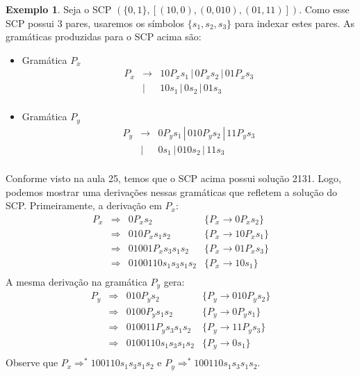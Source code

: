 \documentclass[a4paper]{article}
\theoremstyle{definition}
\newtheorem{Example}{Exemplo}
\begin{document}
  \begin{Example}
    Seja o SCP $(\{0,1\}, [(10,0), (0,010), (01,11)])$. Como esse SCP possui 3
    pares, usaremos os símbolos $\{s_1,s_2,s_3\}$ para indexar estes pares. As
    gramáticas produzidas para o SCP acima são:
    \begin{itemize}
      \item Gramática $P_x$
        \[
          \begin{array}{lcl}
            P_x & \to &  10 P_x s_1 \,|\, 0P_x s_2 \,|\, 01P_x s_3\\
                & \mid & 10s_1 \,|\, 0s_2\,|\, 01s_3\\
          \end{array}
        \]
      \item Gramática $P_y$
        \[
          \begin{array}{lcl}
            P_y & \to & 0P_y s_1 \,|\, 010P_ys_2 \,|\, 11 P_y s_3 \\
                & \mid & 0s_1 \,|\, 010s_2 \,|\, 11s_3\\
          \end{array}
        \]
      \end{itemize}

      Conforme visto na aula 25, temos que o SCP acima possui solução 2131.
      Logo, podemos mostrar uma derivações nessas gramáticas que refletem
      a solução do SCP. Primeiramente, a derivação em $P_x$:
      \[
        \begin{array}{lcll}
          P_x & \Rightarrow & 0P_xs_2       & \{P_x \to 0 P_x s_2\} \\
              & \Rightarrow & 010P_x s_1s_2 & \{P_x \to 10 P_x s_1\} \\
              & \Rightarrow & 01001P_x s_3s_1s_2 & \{P_x \to 01 P_x s_3\} \\
              & \Rightarrow & 0100110s_1s_3s_1s_2 & \{P_x \to 10s_1\}\\
        \end{array}
      \]
      A mesma derivação na gramática $P_y$ gera:
      \[
        \begin{array}{lcll}
          P_y & \Rightarrow & 010P_ys_2       & \{P_y \to 010 P_y s_2\} \\
              & \Rightarrow & 0100P_ys_1s_2   & \{P_y \to 0P_y s_1\}\\
              & \Rightarrow & 010011P_ys_3s_1s_2 & \{P_y \to 11 P_y s_3\} \\
              & \Rightarrow & 0100110s_1s_3s_1s_2 & \{P_y \to 0s_1\}\\
        \end{array}
      \]
      Observe que $P_x \Rightarrow^* 100110 s_1 s_3 s_1 s_2$ e
      $P_y \Rightarrow^* 100110 s_1 s_3 s_1 s_2$.
    \end{Example}
\end{document}
